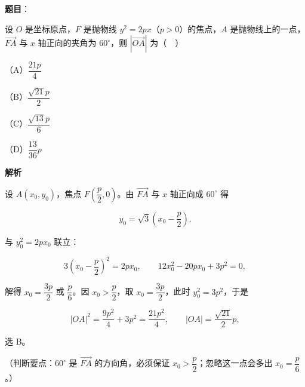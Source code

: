 \begin{answer}

\textbf{题目}：

设 $O$ 是坐标原点，$F$ 是抛物线 $y^2=2px$（$p>0$）的焦点，$A$ 是抛物线上的一点，$\overrightarrow{FA}$ 与 $x$ 轴正向的夹角为 $60^\circ$，则 $\left|\overrightarrow{OA}\right|$ 为（　）

（A）$\dfrac{21p}{4}$

（B）$\dfrac{\sqrt{21}p}{2}$

（C）$\dfrac{\sqrt{13}p}{6}$

（D）$\dfrac{13}{36}p$

\textbf{解析}

设 $A(x_0,y_0)$，焦点 $F\left(\dfrac p2,0\right)$。由 $\overrightarrow{FA}$ 与 $x$ 轴正向成 $60^\circ$ 得

\nopagebreak[4]
\[y_0=\sqrt3\left(x_0-\frac p2\right).\]

与 $y_0^2=2px_0$ 联立：

\nopagebreak[4]
\[3\left(x_0-\frac p2\right)^2=2px_0,\qquad 12x_0^2-20px_0+3p^2=0,\]

解得 $x_0=\dfrac{3p}{2}$ 或 $\dfrac p6$。因 $x_0>\dfrac p2$，取 $x_0=\dfrac{3p}{2}$，此时 $y_0^2=3p^2$，于是

\nopagebreak[4]
\[|OA|^2=\frac{9p^2}{4}+3p^2=\frac{21p^2}{4},\qquad |OA|=\frac{\sqrt{21}}{2}p,\]

选 B。

（判断要点：$60^\circ$ 是 $\overrightarrow{FA}$ 的方向角，必须保证 $x_0>\dfrac p2$；忽略这一点会多出 $x_0=\dfrac p6$。）


\end{answer}
